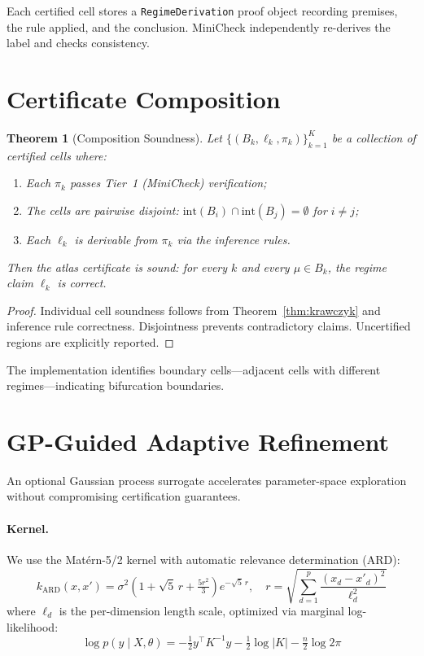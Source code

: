 \documentclass[11pt]{article}
\newtheorem{theorem}{Theorem}
\begin{document}
Each certified cell stores a \texttt{RegimeDerivation} proof object recording premises, the rule applied, and the conclusion.
MiniCheck independently re-derives the label and checks consistency.

\section{Certificate Composition}
\label{sec:composition}

\begin{theorem}[Composition Soundness]
\label{thm:composition}
Let $\{(B_k, \ell_k, \pi_k)\}_{k=1}^K$ be a collection of certified cells where:
\begin{enumerate}
\item Each $\pi_k$ passes Tier~1 (MiniCheck) verification;
\item The cells are pairwise disjoint: $\mathrm{int}(B_i) \cap \mathrm{int}(B_j) = \emptyset$ for $i \neq j$;
\item Each $\ell_k$ is derivable from $\pi_k$ via the inference rules.
\end{enumerate}
Then the atlas certificate is sound: for every $k$ and every $\mu \in B_k$, the regime claim $\ell_k$ is correct.
\end{theorem}

\begin{proof}
Individual cell soundness follows from Theorem~\ref{thm:krawczyk} and inference rule correctness.
Disjointness prevents contradictory claims.
Uncertified regions are explicitly reported.
\end{proof}

The implementation identifies boundary cells---adjacent cells with different regimes---indicating bifurcation boundaries.

\section{GP-Guided Adaptive Refinement}
\label{sec:gp}

An optional Gaussian process surrogate accelerates parameter-space exploration without compromising certification guarantees.

\paragraph{Kernel.}
We use the Mat\'ern-5/2 kernel with automatic relevance determination (ARD):
\[
k_{\mathrm{ARD}}(x, x') = \sigma^2 \!\left(1 + \sqrt{5}\,r + \tfrac{5r^2}{3}\right) e^{-\sqrt{5}\,r}, \quad r = \sqrt{\textstyle\sum_{d=1}^p \frac{(x_d - x'_d)^2}{\ell_d^2}}
\]
where $\ell_d$ is the per-dimension length scale, optimized via marginal log-likelihood:
\[
\log p(y \mid X, \theta) = -\tfrac{1}{2} y^\top K^{-1} y - \tfrac{1}{2} \log |K| - \tfrac{n}{2} \log 2\pi
\]
\end{document}
